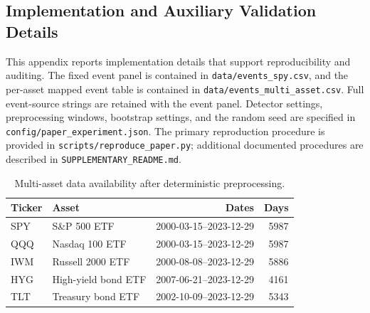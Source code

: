 \documentclass[pdflatex,sn-mathphys-num]{sn-jnl}
\begin{document}
\clearpage
\begin{appendices}
\renewcommand{\theHtable}{A.\arabic{table}}
\renewcommand{\theHfigure}{A.\arabic{figure}}
\renewcommand{\theHequation}{A.\arabic{equation}}
\section{Implementation and Auxiliary Validation Details}
\label{app:implementation_details}
This appendix reports implementation details that support reproducibility and auditing. The fixed event panel is contained in \texttt{data/events\_spy.csv}, and the per-asset mapped event table is contained in \texttt{data/events\_multi\_asset.csv}. Full event-source strings are retained with the event panel. Detector settings, preprocessing windows, bootstrap settings, and the random seed are specified in \texttt{config/paper\_experiment.json}. The primary reproduction procedure is provided in \texttt{scripts/reproduce\_paper.py}; additional documented procedures are described in \texttt{SUPPLEMENTARY\_README.md}.

\begin{table}[t]
\centering
\caption{Multi-asset data availability after deterministic preprocessing.}
\label{tab:asset_availability}
\scriptsize
\begin{tabular}{llrr}
\toprule
Ticker & Asset & Dates & Days\\
\midrule
SPY & S\&P 500 ETF & 2000-03-15--2023-12-29 & 5987\\
QQQ & Nasdaq 100 ETF & 2000-03-15--2023-12-29 & 5987\\
IWM & Russell 2000 ETF & 2000-08-08--2023-12-29 & 5886\\
HYG & High-yield bond ETF & 2007-06-21--2023-12-29 & 4161\\
TLT & Treasury bond ETF & 2002-10-09--2023-12-29 & 5343\\
\bottomrule
\end{tabular}
\end{table}


\end{appendices}
\end{document}

